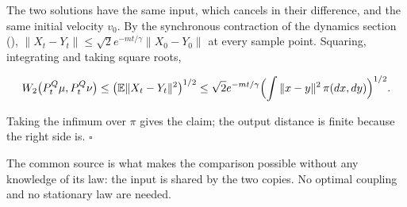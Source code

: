 \documentclass[11pt,a4paper]{article}
\begin{document}
The two solutions have the same input, which cancels in their difference, and the same initial velocity \(v_0\). By the synchronous contraction of the dynamics section (\cite[Section~3.11.3]{LangevinLean2026KIPLMC}), \(\|X_t-Y_t\|\le\sqrt2e^{-mt/\gamma}\|X_0-Y_0\|\) at every sample point. Squaring, integrating and taking square roots,


\[W_2\bigl(P^Q_t\mu,P^Q_t\nu\bigr)\le\bigl(\mathbb E\|X_t-Y_t\|^2\bigr)^{1/2}\le\sqrt2e^{-mt/\gamma}\Bigl(\int\|x-y\|^2\,\pi(dx,dy)\Bigr)^{1/2}.\]


Taking the infimum over \(\pi\) gives the claim; the output distance is finite because the right side is. \(\square\)




The common source is what makes the comparison possible without any knowledge of its law: the input is shared by the two copies. No optimal coupling and no stationary law are needed.
\end{document}
